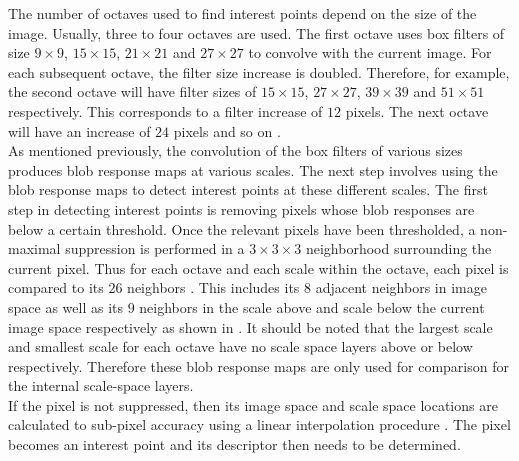 \documentclass{article}
\begin{document}
The number of octaves used to find interest points depend on the size of the image. Usually, three to four octaves are used. The first octave uses box filters of size $9 \times 9$, $15 \times 15$, $21 \times 21$ and $27 \times 27$ to convolve with the current image.  For each subsequent octave, the filter size increase is doubled. Therefore, for example, the second octave will have filter sizes of $15 \times 15$, $27 \times 27$, $39 \times 39$ and $51 \times 51$ respectively. This corresponds to a filter increase of $12$ pixels. The next octave will have an increase of $24$ pixels and so on \cite{Bay2008}. \\

As mentioned previously, the convolution of the box filters of various sizes produces blob response maps at various scales. The next step involves using the blob response maps to detect interest points at these different scales. The first step in detecting interest points is removing pixels whose blob responses are below a certain threshold. Once the relevant pixels have been thresholded,  a non-maximal suppression is performed in a $3 \times 3 \times 3$ neighborhood surrounding the current pixel. Thus for each octave and each scale within the octave, each pixel is compared to its $26$ neighbors \cite{Evans2009}. This includes its $8$ adjacent neighbors in image space as well as its $9$ neighbors in the scale above and scale below the current image space respectively as shown in . It should be noted that the largest scale and smallest scale for each octave have no scale space layers above or below respectively. Therefore these blob response maps are only used for comparison for the internal scale-space layers. \\

If the pixel is not suppressed, then its image space and scale space locations are calculated to sub-pixel accuracy using a linear interpolation procedure \cite{Evans2009}. The pixel becomes an interest point and its descriptor then needs to be determined.\\

\end{document}
